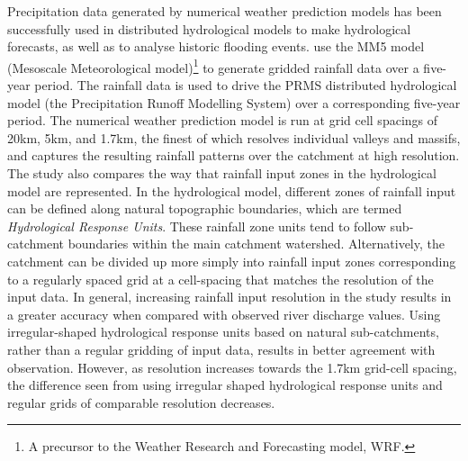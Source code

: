 Precipitation data generated by numerical weather prediction models has been successfully used in distributed hydrological models to make hydrological forecasts, as well as to analyse historic flooding events. \citet{hay2006one} use the MM5 model (Mesoscale Meteorological model)\footnote{A precursor to the Weather Research and Forecasting model, WRF.} to generate gridded rainfall data over a five-year period. The rainfall data is used to drive the PRMS distributed hydrological model (the Precipitation Runoff Modelling System) over a corresponding five-year period. The numerical weather prediction model is run at grid cell spacings of 20km, 5km, and 1.7km, the finest of which resolves individual valleys and massifs, and captures the resulting rainfall patterns over the catchment at high resolution. The study also compares the way that rainfall input zones in the hydrological model are represented. In the hydrological model, different zones of rainfall input can be defined along natural topographic boundaries, which are termed \textit{Hydrological Response Units}. These rainfall zone units tend to follow sub-catchment boundaries within the main catchment watershed. Alternatively, the catchment can be divided up more simply into rainfall input zones corresponding to a regularly spaced grid at a cell-spacing that matches the resolution of the input data.
In general, increasing rainfall input resolution in the \citet{hay2006one} study results in a greater accuracy when compared with observed river discharge values. Using irregular-shaped hydrological response units based on natural sub-catchments, rather than a regular gridding of input data, results in better agreement with observation. However, as resolution increases towards the 1.7km grid-cell spacing, the difference seen from using irregular shaped hydrological response units and regular grids of comparable resolution decreases. 

